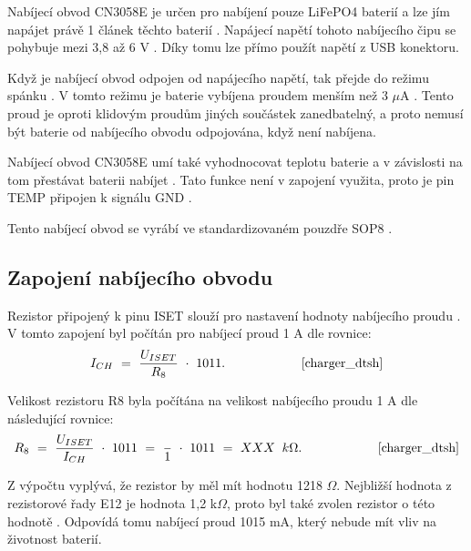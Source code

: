 Nabíjecí obvod CN3058E je určen pro nabíjení pouze LiFePO4 baterií a lze jím napájet právě 1 článek těchto baterií \cite{charger_dtsh}. Napájecí napětí tohoto 
nabíjecího čipu se pohybuje mezi 3,8 až 6 V \cite{charger_dtsh}. Díky tomu lze přímo použít napětí z USB konektoru. 

Když je nabíjecí obvod odpojen od napájecího napětí, tak přejde do režimu spánku \cite{charger_dtsh}. V tomto režimu je baterie vybíjena proudem menším než 
3 $\mu$A \cite{charger_dtsh}. Tento proud je oproti klidovým proudům jiných součástek zanedbatelný, a proto nemusí být baterie od nabíjecího obvodu odpojována,
když není nabíjena. 

Nabíjecí obvod CN3058E umí také vyhodnocovat teplotu baterie a v závislosti na tom přestávat baterii nabíjet \cite{charger_dtsh}. Tato funkce není v zapojení využita,
proto je pin TEMP připojen k signálu GND \cite{charger_dtsh}.


Tento nabíjecí obvod se vyrábí ve standardizovaném pouzdře SOP8 \cite{charger_dtsh}.

\subsection{Zapojení nabíjecího obvodu}
Rezistor připojený k pinu ISET slouží pro nastavení hodnoty nabíjecího proudu \cite{charger_dtsh}. V tomto zapojení byl počítán pro nabíjecí proud 1 A dle rovnice: 
\begin{equation} 
  I_{CH}~=~\frac{U_{ISET}}{R_{8}}~\cdot~1011. 
  \quad \quad \quad \quad \quad \quad \cite{charger_dtsh}
\label{eq:I_CH}
\end{equation}



Velikost rezistoru R8 byla počítána na velikost nabíjecího proudu 1 A dle následující rovnice:
\begin{equation} 
  R_{8}~=~\frac{U_{ISET}}{I_{CH}}~\cdot~1011~=~\frac{}{1}~\cdot~1011~=~XXX~\:k\Omega. 
  \quad \quad \quad \quad \quad \quad \cite{charger_dtsh}
\label{eq:R_8}
\end{equation}


Z výpočtu vyplývá, že rezistor by měl mít hodnotu 1218 $\Omega$. Nejbližší hodnota z rezistorové řady E12 je hodnota 1,2 k$\Omega$, proto byl také zvolen rezistor 
o této hodnotě \cite{rezistorova_rada}. Odpovídá tomu nabíjecí proud 1015 mA, který nebude mít vliv na životnost baterií. 

